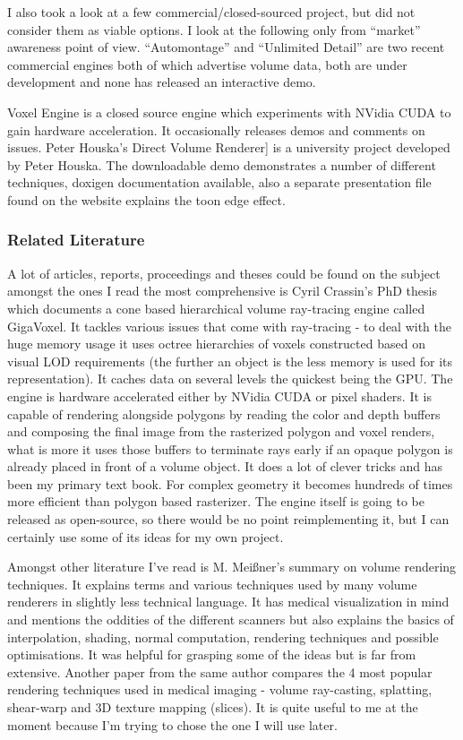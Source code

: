 \documentclass[11pt,fleqn,twoside]{article}
\begin{document}
I also took a look at a few commercial/closed-sourced project, but did not consider them as viable options. I look at the following only from ``market'' awareness point of view. ``Automontage''\cite{Automontage} and ``Unlimited Detail''\cite{UnlimitedDetail} are two recent commercial engines both of which advertise volume data, both are under development and none has released an interactive demo.

Voxel Engine\cite{VoxelEngineDevelopment} is a closed source engine which experiments with NVidia CUDA to gain hardware acceleration. It occasionally releases demos and comments on issues. Peter Houska's Direct Volume Renderer\cite{PHDVR}] is a university project developed by Peter Houska. The downloadable demo demonstrates a number of different techniques, doxigen documentation available, also a separate presentation file found on the website explains the toon edge effect.


\subsubsection{Related Literature}

A lot of articles, reports, proceedings and theses could be found on the subject amongst the ones I read the most comprehensive is Cyril Crassin's PhD thesis\cite{CCrassinThesis} which documents a cone based hierarchical volume ray-tracing engine called GigaVoxel. It tackles various issues that come with ray-tracing - to deal with the huge memory usage it uses octree hierarchies of voxels constructed based on visual LOD requirements (the further an object is the less memory is used for its representation). It caches data on several levels the quickest being the GPU. The engine is hardware accelerated either by NVidia CUDA or pixel shaders. It is capable of rendering alongside polygons by reading the color and depth buffers and composing the final image from the rasterized  polygon and voxel renders, what is more it uses those buffers to terminate rays early if an opaque polygon is already placed in front of a volume object. It does a lot of clever tricks and has been my primary text book. For complex geometry it becomes hundreds of times more efficient than polygon based rasterizer. The engine itself is going to be released as open-source, so there would be no point reimplementing it, but I can certainly use some of its ideas for my own project.

Amongst other literature I've read is M. Mei\ss{}ner's summary on volume rendering techniques\cite{VolumeRenderingTut}. It explains terms and various techniques used by many volume renderers in slightly less technical language. It has medical visualization in mind and mentions the oddities of the different scanners but also explains the basics of interpolation, shading, normal computation, rendering techniques and possible optimisations. It was helpful for grasping some of the ideas but is far from extensive. Another paper from the same author\cite{AlgorithmComparison} compares the 4 most popular rendering techniques used in medical imaging - volume ray-casting, splatting, shear-warp and 3D texture mapping (slices). It is quite useful to me at the moment because I'm trying to chose the one I will use later.
\end{document}
